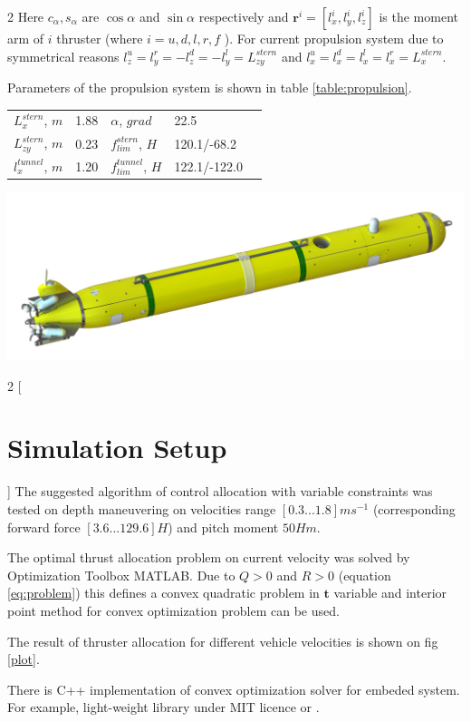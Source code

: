 \documentclass[a0,portrait]{a0poster}
\begin{document}
\begin{minipage}[t]{0.48\linewidth}
\begin{multicols}{2}
Here $c_{\alpha}, s_{\alpha}$ are $\cos{\alpha}$ and $\sin{\alpha}$ respectively and $\boldsymbol{r}^i = [l_x^i, l_y^i, l_z^i]$ is the moment arm of $i$ thruster (where $i = u,d,l,r,f$ ). For current propulsion system due to symmetrical reasons $l_z^u = l_y^r = -l_z^d = -l_y^l = L_{zy}^{stern}$ and $l_x^u=l_x^d=l_x^l=l_x^r = L_{x}^{stern}$.

Parameters of the propulsion system is shown in table \ref{table:propulsion}.

\begin{center}
\begin{tabular}{l l l l l}
\toprule
$L_{x}^{stern}$,  $m$ & 1.88  & $\alpha$,           $grad$ & 22.5 \\
$L_{zy}^{stern}$, $m$ & 0.23  & $f_{lim}^{stern}$,  $H$    & 120.1/-68.2 \\
$l_x^{tunnel}$,   $m$ & 1.20  & $f_{lim}^{tunnel}$, $H$    & 122.1/-122.0\\
\bottomrule
\end{tabular}
\label{table:propulsion}
\end{center}\vspace{1cm}
\end{multicols}

\includegraphics[width=1.0\linewidth]{fig/auv.png}
\label{fig:auv}

\begin{multicols}{2}
[
\section*{Simulation Setup}
]
The suggested algorithm of control allocation with variable constraints was tested on depth maneuvering on velocities range $[0.3...1.8]ms^{-1}$ (corresponding forward force $[3.6...129.6]H$) and pitch moment $50Hm$.

The optimal thrust allocation problem on current velocity was solved by Optimization Toolbox MATLAB. Due to $Q>0$ and $R>0$ (equation \ref{eq:problem}) this defines a convex quadratic problem in $\boldsymbol{t}$ variable and interior point method for convex optimization problem can be used.

The result of thruster allocation for different vehicle velocities is shown on fig \ref{plot}.

There is C++ implementation of convex optimization solver for embeded system. For example, light-weight library under MIT licence \cite{repo} or \cite{qp_1}.
\end{multicols}
\end{minipage}
\end{document}
